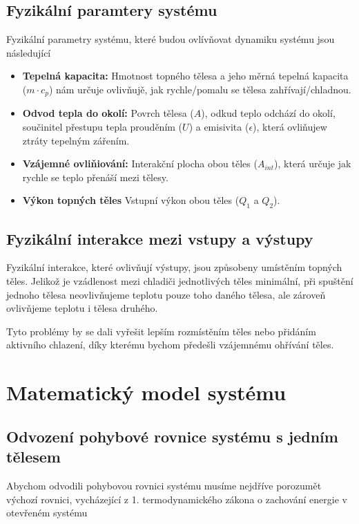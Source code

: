 \documentclass[12pt]{article} %
\begin{document}
\subsection{Fyzikální paramtery systému}
Fyzikální parametry systému, které budou ovlívňovat dynamiku systému jsou následující

\begin{itemize}
    \item \textbf{Tepelná kapacita:} Hmotnost topného tělesa a jeho měrná tepelná kapacita ($m \cdot c_p$) nám určuje ovlivňujě, jak rychle/pomalu se tělesa zahřívají/chladnou.
    
    \item \textbf{Odvod tepla do okolí:} Povrch tělesa ($A$), odkud teplo odchází do okolí, součinitel přestupu tepla prouděním ($U$) a emisivita ($\epsilon$), která ovliňujew ztráty tepelným zářením.
     
    \item \textbf{Vzájemné ovliňiování:} Interakční plocha obou těles ($A_{int}$), která určuje jak rychle se teplo přenáší mezi tělesy.
    
    \item \textbf{Výkon topných těles} Vstupní výkon obou těles ($Q_1$ a $Q_2$).
\end{itemize}

\subsection{Fyzikální interakce mezi vstupy a výstupy}
Fyzikální interakce, které ovlivňují výstupy, jsou způsobeny umístěním topných těles. Jelikož je vzádlenost mezi chladiči jednotlivých těles minimální, při spuštění jednoho tělesa neovlivňujeme teplotu pouze toho daného tělesa, ale zároveň ovlivňjeme teplotu i tělesa druhého.

Tyto problémy by se dali vyřešit lepším rozmístěním těles nebo přidáním aktivního chlazení, díky kterému bychom předešli vzájemnému ohřívání těles.

\section{Matematický model systému}
\subsection{Odvození pohybové rovnice systému s jedním tělesem}
Abychom odvodili pohybovou rovnici systému musíme nejdříve porozumět výchozí rovnici, vycházející z 1. termodynamického zákona o zachování energie v otevřeném systému
\end{document}
